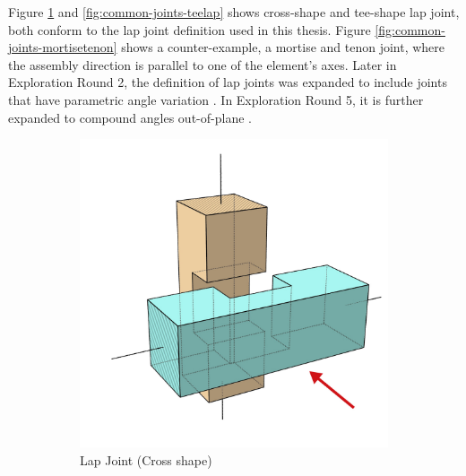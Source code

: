 Figure \ref{fig:common-joints-crosslap} and \ref{fig:common-joints-teelap} shows cross-shape and tee-shape lap joint, both conform to the lap joint definition used in this thesis. Figure \ref{fig:common-joints-mortisetenon} shows a counter-example, a mortise and tenon joint, where the assembly direction is parallel to one of the element’s axes. Later in Exploration Round 2, the definition of lap joints was expanded to include joints that have parametric angle variation . In Exploration Round 5, it is further expanded to compound angles out-of-plane . 

\begin{figure}[H]
     \centering
     \begin{subfigure}[b]{0.32\textwidth}
         \centering
         \includegraphics[width=\textwidth]{images/04-1+2/CrossLap_6_witharrows.jpg}
         \caption{Lap Joint (Cross shape)}
         \label{fig:common-joints-crosslap}
     \end{subfigure}
     \hfill
     \begin{subfigure}[b]{0.32\textwidth}
         \centering

\end{subfigure}
\end{figure}

